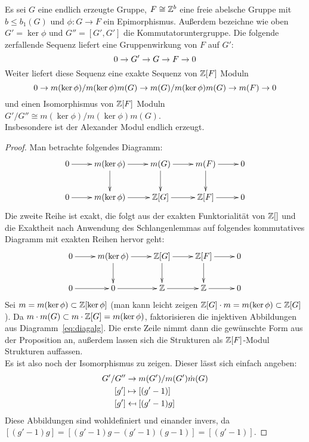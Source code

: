 \begin{prop}
	Es sei $G$ eine endlich erzeugte Gruppe, $F \cong \mathbb{Z}^b$ eine freie abelsche Gruppe mit $b\leq b_1(G)$ und $\phi: G \to F$ ein Epimorphismus. Außerdem bezeichne wie oben $G'=\ker\phi$ und $G''=[G',G']$ die Kommutatoruntergruppe. Die folgende zerfallende Sequenz liefert eine Gruppenwirkung von $F$ auf $G'$:
	\[
		0\to G'\to G\to F\to0
	\]
	Weiter liefert diese Sequenz eine exakte Sequenz von $\mathbb{Z}[F]$ Moduln
	\[
		0\to m(\ker\phi)/m(\ker\phi)m(G)\to m(G)/m(\ker\phi)m(G)\to m(F)\to0
	\]
	und einen Isomorphismus von $\mathbb{Z}[F]$ Moduln $G'/G'' \cong m(\ker\phi)/m(\ker\phi)m(G)$.\\
	Insbesondere ist der Alexander Modul endlich erzeugt.
\end{prop}
\begin{proof}
		Man betrachte folgendes Diagramm:
		\begin{equation}
		\label{eq:diagalg}
			\begin{xy}
				\xymatrix{	0 \ar[r]&	m(\ker\phi) \ar[r] \ar[d]&	m(G) \ar[r] \ar[d]& m(F) \ar[r] \ar[d]&	0\\
							0 \ar[r]&	m(\ker\phi)	\ar[r] 		&	\ZZ[G] \ar[r]	&	\ZZ[F] \ar[r] &		0}
			\end{xy}			
		\end{equation}
		Die zweite Reihe ist exakt, die folgt aus der exakten Funktorialität von $\mathbb{Z}[]$ und die Exaktheit nach Anwendung des Schlangenlemmas auf folgendes kommutatives Diagramm mit exakten Reihen hervor geht:
		\[
			\begin{xy}
				\xymatrix{	0 \ar[r]&	m(\ker\phi) \ar[r] \ar[d]&	\ZZ[G] \ar[r] \ar[d]& \ZZ[F] \ar[r] \ar[d]&	0\\
							0 \ar[r]&		0		\ar[r] 		&	\ZZ \ar[r]	&	\ZZ \ar[r] &		0}
			\end{xy}
		\]
		Sei $m=m(\ker\phi)\subset \mathbb{Z}[\ker\phi]$ (man kann leicht zeigen $\mathbb{Z}[G]\cdot m = m(\ker\phi) \subset \mathbb{Z}[G]$). Da $m\cdot m(G)\subset m\cdot \mathbb{Z}[G] = m(\ker\phi)$, faktorisieren die injektiven Abbildungen aus Diagramm~\ref{eq:diagalg}. Die erste Zeile nimmt dann die gewünschte Form aus der Proposition an, außerdem lassen sich die Strukturen als $\mathbb{Z}[F]$-Modul Strukturen auffassen.\\
		Es ist also noch der Isomorphismus zu zeigen. Dieser lässt sich einfach angeben:
		\begin{align*}
			G'/G'' 	&\to 		m(G')/m(G')\dot m(G)\\
			[g']		&\mapsto	[(g'-1)]\\
			[g']		&\mathrel{\reflectbox{\ensuremath{\mapsto}}}  [(g'-1)g]
		\end{align*}
		Diese Abbildungen sind wohldefiniert und einander invers, da $[(g'-1)g]=[(g'-1)g-(g'-1)(g-1)]=[(g'-1)]$.
	\end{proof}	

